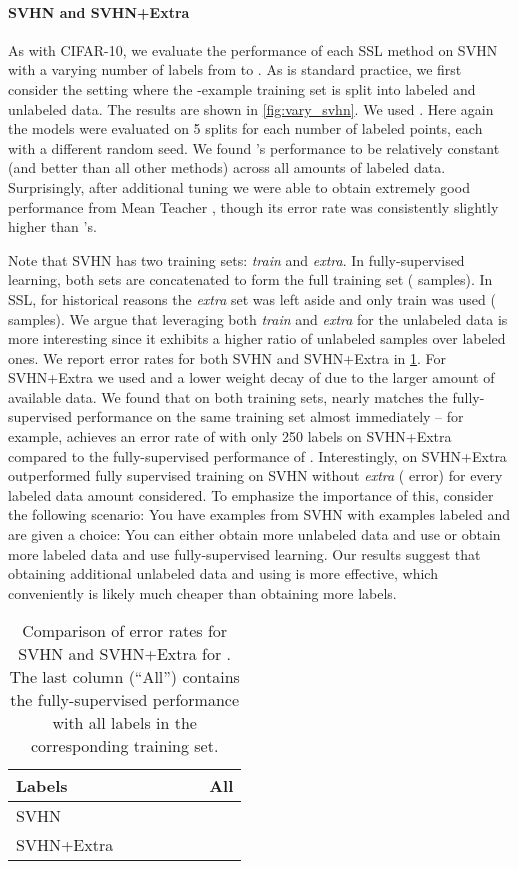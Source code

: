 \documentclass{article}
\begin{document}
\paragraph{SVHN and SVHN+Extra}
As with CIFAR-10, we evaluate the performance of each SSL method on SVHN with a varying number of labels from  to .
As is standard practice, we first consider the setting where the -example training set is split into labeled and unlabeled data.
The results are shown in \cref{fig:vary_svhn}.
We used .
Here again the models were evaluated on 5 splits for each number of labeled points, each with a different random seed.
We found 's performance to be relatively constant (and better than all other methods) across all amounts of labeled data.
Surprisingly, after additional tuning we were able to obtain extremely good performance from Mean Teacher \cite{tarvainen2017weight}, though its error rate was consistently slightly higher than 's.

Note that SVHN has two training sets: \textit{train} and \textit{extra}.
In fully-supervised learning, both sets are concatenated to form the full training set ( samples).
In SSL, for historical reasons the \textit{extra} set was left aside and only train was used ( samples).
We argue that leveraging both \textit{train} and \textit{extra} for the unlabeled data is more interesting since it exhibits a higher ratio of unlabeled samples over labeled ones.
We report error rates for both SVHN and SVHN+Extra in \cref{tab:svhn_nox}.
For SVHN+Extra we used  and a lower weight decay of  due to the larger amount of available data.
We found that on both training sets,  nearly matches the fully-supervised performance on the same training set almost immediately -- for example,  achieves an error rate of  with only 250 labels on SVHN+Extra compared to the fully-supervised performance of .
Interestingly, on SVHN+Extra  outperformed fully supervised training on SVHN without \textit{extra} ( error) for every labeled data amount considered.
To emphasize the importance of this, consider the following scenario:
You have  examples from SVHN with  examples labeled and are given a choice: You can either obtain  more unlabeled data and use  or obtain  more labeled data and use fully-supervised learning.
Our results suggest that obtaining additional unlabeled data and using  is more effective, which conveniently is likely much cheaper than obtaining  more labels.

\begin{table}
\centering
\begin{tabular}{lrrrrrr}
\toprule
Labels &  &  &  &  &  & All \\
\midrule
 SVHN &  &  &  &  &  &  \\
 SVHN+Extra &  &  &  &  &  &  \\
\bottomrule
\end{tabular}
\vskip 0.1in
\caption{Comparison of error rates for SVHN and SVHN+Extra for . The last column (``All'') contains the fully-supervised performance with all labels in the corresponding training set.}
\label{tab:svhn_nox}
\vskip -0.2in
\end{table}
\end{document}
